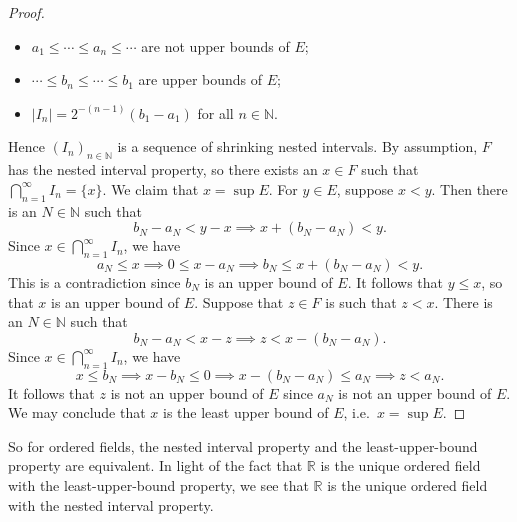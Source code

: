 \documentclass[12pt]{article}
\theoremstyle{definition}
\begin{document}
\begin{proof}
\begin{itemize}
        \item \( a_1 \leq \cdots \leq a_n \leq \cdots \) are not upper bounds of \( E \);
        \item \( \cdots \leq b_n \leq \cdots \leq b_1 \) are upper bounds of \( E \);
        \item \( |I_n| = 2^{-(n-1)}(b_1 - a_1) \) for all \( n \in \mathbb{N} \).
    \end{itemize}
    Hence \( (I_n)_{n \in \mathbb{N}} \) is a sequence of shrinking nested intervals. By assumption, \( F \) has the nested interval property, so there exists an \( x \in F \) such that \( \bigcap_{n=1}^{\infty} I_n = \{ x \} \). We claim that \( x = \sup E \). For \( y \in E \), suppose \( x < y \). Then there is an \( N \in \mathbb{N} \) such that
    \[
        b_N - a_N < y - x \implies x + (b_N - a_N) < y.
    \]
    Since \( x \in \bigcap_{n=1}^{\infty} I_n \), we have
    \[
        a_N \leq x \implies 0 \leq x - a_N \implies b_N \leq x + (b_N - a_N) < y.
    \]
    This is a contradiction since \( b_N \) is an upper bound of \( E \). It follows that \( y \leq x \), so that \( x \)  is an upper bound of \( E \). Suppose that \( z \in F \) is such that \( z < x \). There is an \( N \in \mathbb{N} \) such that
    \[
        b_N - a_N < x - z \implies z < x - (b_N - a_N).
    \]
    Since \( x \in \bigcap_{n=1}^{\infty} I_n \), we have
    \[
        x \leq b_N \implies x - b_N \leq 0 \implies x - (b_N - a_N) \leq a_N \implies z < a_N.
    \]
    It follows that \( z \) is not an upper bound of \( E \) since \( a_N \) is not an upper bound of \( E \). We may conclude that \( x \) is the least upper bound of \( E \), i.e.\ \( x = \sup E \).
\end{proof}

So for ordered fields, the nested interval property and the least-upper-bound property are equivalent. In light of the fact that \( \mathbb{R} \) is the unique ordered field with the least-upper-bound property, we see that \( \mathbb{R} \) is the unique ordered field with the nested interval property.
\end{document}
